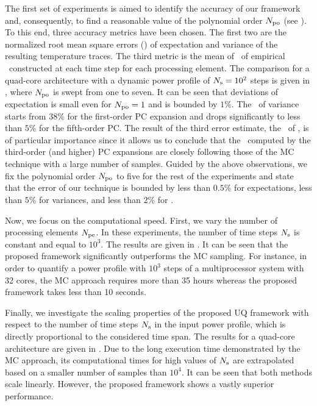 
The first set of experiments is aimed to identify the accuracy of our framework and, consequently, to find a reasonable value of the polynomial order ${N_\text{po}}$ (see ). To this end, three accuracy metrics have been chosen. The first two are the normalized root mean square errors (\nrmse) of expectation and variance of the resulting temperature traces. The third metric is the mean of \nrmses\ of empirical \pdfs\ constructed at each time step for each processing element. The comparison for a quad-core architecture with a dynamic power profile of $N_\text{s} = 10^2$ steps is given in , where ${N_\text{po}}$ is swept from one to seven. It can be seen that deviations of expectation is small even for ${N_\text{po}} = 1$ and is bounded by $1\%$. The \nrmse\ of variance starts from $38\%$ for the first-order PC expansion and drops significantly to less than $5\%$ for the fifth-order PC. The result of the third error estimate, the \nrmse\ of \pdfs, is of particular importance since it allows us to conclude that the \pdfs\ computed by the third-order (and higher) PC expansions are closely following those of the MC technique with a large number of samples. Guided by the above observations, we fix the polynomial order ${N_\text{po}}$ to five for the rest of the experiments and state that the error of our technique is bounded by less than $0.5\%$ for expectations, less than $5\%$ for variances, and less than $2\%$ for \pdfs.


Now, we focus on the computational speed. First, we vary the number of processing elements ${N_\text{pe}}$. In these experiments, the number of time steps $N_\text{s}$ is constant and equal to $10^3$. The results are given in . It can be seen that the proposed framework significantly outperforms the MC sampling. For instance, in order to quantify a power profile with $10^3$ steps of a multiprocessor system with 32 cores, the MC approach requires more than 35 hours whereas the proposed framework takes less than 10 seconds.

Finally, we investigate the scaling properties of the proposed UQ framework with respect to the number of time steps $N_\text{s}$ in the input power profile, which is directly proportional to the considered time span. The results for a quad-core architecture are given in . Due to the long execution time demonstrated by the MC approach, its computational times for high values of $N_\text{s}$ are extrapolated based on a smaller number of samples than $10^4$. It can be seen that both methods scale linearly. However, the proposed framework shows a vastly superior performance.
